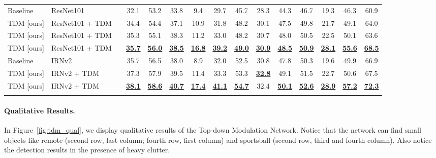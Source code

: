 \documentclass[10pt,twocolumn,letterpaper]{article}
\newcommand{\hl}[1]{\underline{\textbf{#1}}}
\begin{document}
\begin{table*}[t]
{\begin{tabular}{
@{}L{2.2cm} L{2.5cm} o{2.4cm}
!{\color{gray}\vrule} ccc
!{\color{gray}\vrule} ccc
!{\color{gray}\vrule} ccc
!{\color{gray}\vrule} ccc
@{}}
Baseline & ResNet101 &   & 32.1 & 53.2 & 33.8 & 9.4 & 29.7 & 45.7 & 28.3 & 44.3 & 46.7 & 19.3 & 46.3 & 60.9 \\
TDM [ours] & ResNet101 + TDM &  & 34.4 & 54.4 & 37.1 & 10.9 & 31.8 & 48.2 & 30.1 & 47.5 & 49.8 & 21.7 & 49.1 & 64.0 \\
TDM [ours] & ResNet101 + TDM &  & 35.3 & 55.1 & 38.3 & 11.2 & 33.0 & 48.2 & 30.7 & 48.0 & 50.5 & 22.5 & 50.1 & 63.6 \\
TDM [ours] & ResNet101 + TDM &  & \hl{35.7} & \hl{56.0} & \hl{38.5} & \hl{16.8} & \hl{39.2} & \hl{49.0} & \hl{30.9} & \hl{48.5} & \hl{50.9} & \hl{28.1} & \hl{55.6} & \hl{68.5} \\
\Xhline{1pt}
Baseline & IRNv2 &  & 35.7 & 56.5 & 38.0 & 8.9 & 32.0 & 52.5 & 30.8 & 47.8 & 50.3 & 19.6 & 49.9 & 66.9 \\
TDM [ours] & IRNv2 + TDM &  & 37.3 & 57.9 & 39.5 & 11.4 & 33.3 & 53.3 & \hl{32.8} & 49.1 & 51.5 & 22.7 & 50.6 & 67.5 \\
TDM [ours] & IRNv2 + TDM &  & \hl{38.1} & \hl{58.6} & \hl{40.7} & \hl{17.4} & \hl{41.1} & \hl{54.7} & 32.4 & \hl{50.1} & \hl{52.6} & \hl{28.9} & \hl{57.2} & \hl{72.3} \\
\Xhline{1pt}
\end{tabular}
}
\vspace{-0.1in}
\label{tab:coco_minival}
\end{table*}



\paragraph{Qualitative Results.}
In Figure~\ref{fig:tdm_qual}, we display qualitative results of the Top-down Modulation Network. Notice that the network can find small objects like remote (second row, last column; fourth row, first column) and sportsball (second row, third and fourth column). Also notice the detection results in the presence of heavy clutter.
\end{document}
